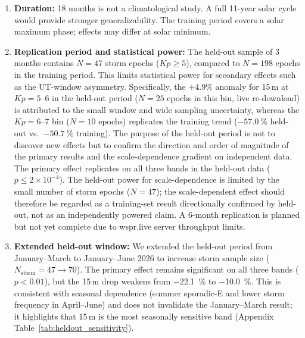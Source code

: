 \documentclass{agujournal2019}
\begin{document}
\begin{enumerate}
	\item \textbf{Duration:} 18 months is not a climatological study. A full
	      11-year solar cycle would provide stronger generalizability. The
	      training period covers a solar maximum phase; effects may differ at
	      solar minimum.
	\item \textbf{Replication period and statistical power:} The held-out
	      sample of 3 months contains $N = 47$ storm epochs
	      ($Kp \ge 5$), compared to $N = 198$ epochs in the training period.
	      This limits statistical power for secondary effects such as the
	      UT-window asymmetry. Specifically, the $+4.9\%$ anomaly for
	      15\,m at $Kp = 5\text{--}6$ in the held-out period ($N = 25$
	      epochs in this bin, live re-download) is attributed to the small
	      window and wide sampling uncertainty, whereas the
	      $Kp = 6\text{--}7$ bin ($N = 10$ epochs) replicates the
	      training trend ($\SI{-57.0}{\percent}$ held-out vs.\
	      $\SI{-50.7}{\percent}$ training). The purpose of the held-out
	      period is not to discover new effects but to confirm the direction
	      and order of magnitude of the primary results and the
	      scale-dependence gradient on independent data.
	      The primary effect replicates on all three bands in the held-out data ($p \le 2 \times 10^{-4}$). The held-out power for scale-dependence is limited by the small number of storm epochs ($N = 47$); the scale-dependent effect should therefore be regarded as a training-set result directionally confirmed by held-out, not as an independently powered claim.
	      A 6-month
	      replication is planned but not yet complete due to wspr.live server
	      throughput limits.

	\item \textbf{Extended held-out window:} We extended the held-out
	      period from January--March to January--June 2026 to increase
	      storm sample size ($N_{\text{storm}} = 47 \rightarrow 70$).
	      The primary effect remains significant on all three bands
	      ($p < 0.01$), but the 15\,m drop weakens from \SI{-22.1}{\percent}
	      to \SI{-10.0}{\percent}. This is consistent with seasonal
	      dependence (summer sporadic-E and lower storm frequency in
	      April--June) and does not invalidate the January--March result;
	      it highlights that 15\,m is the most seasonally sensitive band
	      (Appendix Table~\ref{tab:heldout_sensitivity}).


\end{enumerate}
\end{document}
